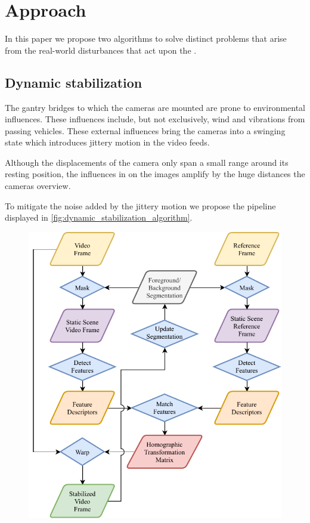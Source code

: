 
\section{Approach}
In this paper we propose two algorithms to solve distinct problems that arise from the real-world disturbances that act upon the \ITS{}.

\subsection{Dynamic stabilization}
\label{sec:dynamic_stabilization}
The gantry bridges to which the cameras are mounted are prone to environmental influences. 
These influences include, but not exclusively, wind and vibrations from passing vehicles.
These external influences bring the cameras into a swinging state which introduces jittery motion in the video feeds.

Although the displacements of the camera only span a small range around its resting position, the influences in on the images amplify by the huge distances the cameras overview.

To mitigate the noise added by the jittery motion we propose the pipeline displayed in \autoref{fig:dynamic_stabilization_algorithm}.

\begin{figure}[t]
  \begin{center}
     \includegraphics[width=0.8\linewidth]{diagrams/DynamicStabilization.pdf}
  \end{center}
     \caption{}
  \label{fig:dynamic_stabilization_algorithm}
  \end{figure}


